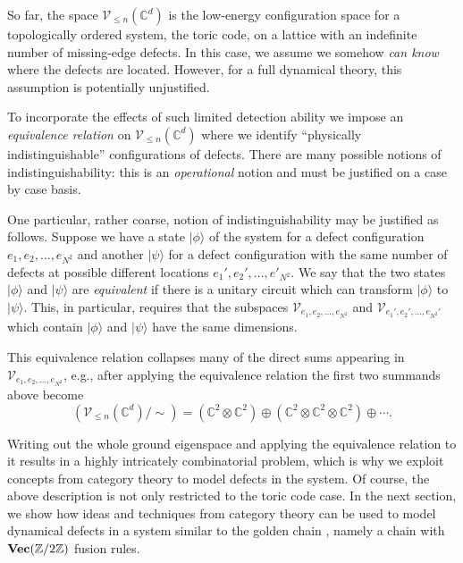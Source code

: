 So far, the space $\mathcal{V}_{\le n}(\mathbb{C}^d)$ is the low-energy configuration space for a topologically ordered system, the toric code, on a lattice with an indefinite number of missing-edge defects. In this case, we assume we somehow \emph{can know} where the defects are located. However, for a full dynamical theory, this assumption is potentially unjustified.

To incorporate the effects of such limited detection ability we impose an \emph{equivalence relation} on $\mathcal{V}_{\le n}(\mathbb{C}^d)$ where we identify ``physically indistinguishable'' configurations of defects. There are many possible notions of indistinguishability: this is an \emph{operational} notion and must be justified on a case by case basis. 

One particular, rather coarse, notion of indistinguishability may be justified as follows. Suppose we have a state $|\phi\rangle$ of the system for a defect configuration $e_1,e_2, \ldots, e_{N^2}$ and another $|\psi\rangle$ for a defect configuration with the same number of defects at possible different locations $e_1',e_2',\ldots, e'_{N^2}$. We say that the two states $|\phi\rangle$ and $|\psi\rangle$ are \emph{equivalent} if there is a unitary circuit which can transform $|\phi\rangle$ to $|\psi\rangle$. This, in particular, requires that the subspaces $\mathcal{V}_{e_1,e_2,\ldots,e_{N^2}}$ and $\mathcal{V}_{e_1',e_2',\ldots,e_{N^2}'}$ which contain $|\phi\rangle$ and $|\psi\rangle$ have the same dimensions.

This equivalence relation collapses many of the direct sums appearing in $\mathcal{V}_{e_1,e_2,\ldots,e_{N^2}}$, e.g., after applying the equivalence relation the first two summands above become
\begin{equation}
	\left(\mathcal{V}_{\le n}(\mathbb{C}^d)/\sim\right) = (\mathbb{C}^2\otimes \mathbb{C}^2)\oplus (\mathbb{C}^2\otimes \mathbb{C}^2\otimes \mathbb{C}^2)\oplus \cdots.
\end{equation}

Writing out the whole ground eigenspace and applying the equivalence relation to it results in a highly intricately combinatorial problem, which is why we exploit concepts from category theory to model defects in the system. Of course, the above description is not only restricted to the toric code case. In the next section, we show how ideas and techniques from category theory can be used to model dynamical defects in a system similar to the golden chain \cite{Feiguin2007}, namely a chain with $\textbf{Vec}(\mathbb{Z}/2\mathbb{Z})$ fusion rules.

  